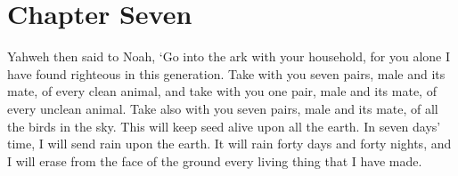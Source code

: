 \chapter*{Chapter Seven}

Yahweh then said to Noah, 
`Go into the ark with your household,
for you alone I have found righteous
in this generation. 
Take with you seven pairs,
male and its mate,
of every clean animal, 
and take with you one pair,
male and its mate,
of every unclean animal.
Take also with you seven pairs,
male and its mate,
of all the birds in the sky.
This will keep seed alive upon all the earth.
In seven days' time,
I will send rain upon the earth. 
It will rain forty days and forty nights,
and I will erase from the face of the ground
every living thing that I have made.